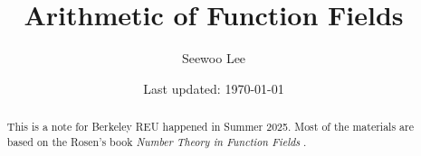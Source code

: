 \documentclass[letterpaper, 10pt]{article}
\begin{document}

\title{Arithmetic of Function Fields}


\author{Seewoo Lee}
\date{\normalsize\vspace{-1ex} Last updated: \today}


\maketitle



\begin{abstract}
This is a note for Berkeley REU happened in Summer 2025.
Most of the materials are based on the Rosen's book \textit{Number Theory in Function Fields} \cite{rosen2013number}.
\end{abstract}





\newpage










\end{document}
